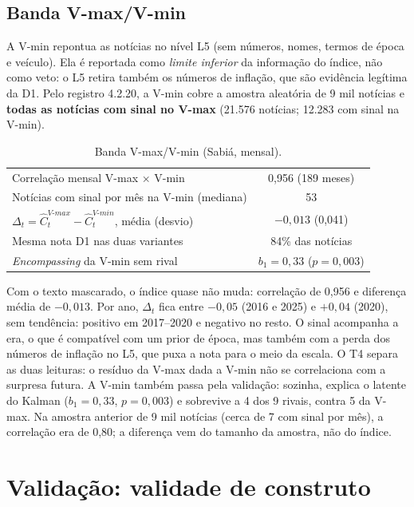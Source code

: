 \documentclass[11pt,a4paper]{article}
\begin{document}
\subsection{Banda V-max/V-min}\label{sec:banda}

A V-min repontua as notícias no nível L5 (sem números, nomes, termos de época
e veículo). Ela é reportada como \emph{limite inferior} da informação do
índice, não como veto: o L5 retira também os números de inflação, que são
evidência legítima da D1. Pelo registro 4.2.20, a V-min cobre a amostra
aleatória de 9 mil notícias e \textbf{todas as notícias com sinal no V-max}
(21.576 notícias; 12.283 com sinal na V-min).

\begin{table}[H]
\centering\small
\caption{Banda V-max/V-min (Sabiá, mensal).}\label{tab:banda}
\begin{tabular}{@{}lc@{}}
\toprule
Correlação mensal V-max $\times$ V-min & 0,956 (189 meses) \\
Notícias com sinal por mês na V-min (mediana) & 53 \\
$\Delta_t=\hat C^{V\text{-}max}_t-\hat C^{V\text{-}min}_t$, média (desvio) & $-0{,}013$ (0,041) \\
Mesma nota D1 nas duas variantes & 84\% das notícias \\
\emph{Encompassing} da V-min sem rival & $b_1=0{,}33$ ($p=0{,}003$) \\
\bottomrule
\end{tabular}
\end{table}

\noindent Com o texto mascarado, o índice quase não muda: correlação de 0,956
e diferença média de $-0{,}013$. Por ano, $\Delta_t$ fica entre $-0{,}05$
(2016 e 2025) e $+0{,}04$ (2020), sem tendência: positivo em 2017--2020 e
negativo no resto. O sinal acompanha a era, o que é compatível com um prior de
época, mas também com a perda dos números de inflação no L5, que puxa a nota
para o meio da escala. O T4 separa as duas leituras: o resíduo da V-max dada a
V-min não se correlaciona com a surpresa futura. A V-min também passa pela
validação: sozinha, explica o latente do Kalman ($b_1=0{,}33$, $p=0{,}003$) e
sobrevive a 4 dos 9 rivais, contra 5 da V-max. Na amostra anterior de 9 mil
notícias (cerca de 7 com sinal por mês), a correlação era de 0,80; a diferença
vem do tamanho da amostra, não do índice.

\section{Validação: validade de construto}\label{sec:validacao}
\end{document}
